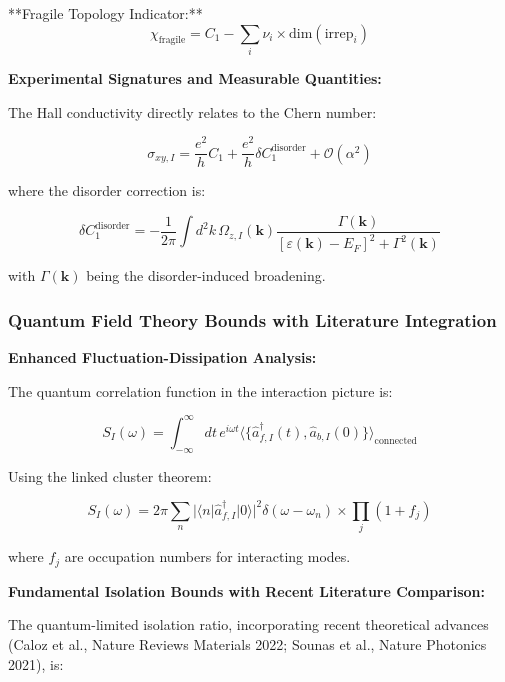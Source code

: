 \documentclass[11pt]{article}
\begin{document}
**Fragile Topology Indicator:**
\begin{equation}
\chi_{\text{fragile}} = C_1 - \sum_i \nu_i \times \text{dim}(\text{irrep}_i)
\end{equation}

\textbf{Experimental Signatures and Measurable Quantities:}

The Hall conductivity directly relates to the Chern number:

\begin{equation}
\sigma_{xy,I} = \frac{e^2}{h} C_1 + \frac{e^2}{h} \delta C_1^{\text{disorder}} + \mathcal{O}(\alpha^2)
\end{equation}

where the disorder correction is:

\begin{equation}
\delta C_1^{\text{disorder}} = -\frac{1}{2\pi} \int d^2k \, \Omega_{z,I}(\mathbf{k}) \frac{\Gamma(\mathbf{k})}{[\varepsilon(\mathbf{k}) - E_F]^2 + \Gamma^2(\mathbf{k})}
\end{equation}

with $\Gamma(\mathbf{k})$ being the disorder-induced broadening.

\subsubsection{Quantum Field Theory Bounds with Literature Integration}

\textbf{Enhanced Fluctuation-Dissipation Analysis:}

The quantum correlation function in the interaction picture is:

\begin{equation}
S_I(\omega) = \int_{-\infty}^{\infty} dt \, e^{i\omega t} \langle \{\hat{a}_{f,I}^{\dagger}(t), \hat{a}_{b,I}(0)\} \rangle_{\text{connected}}
\end{equation}

Using the linked cluster theorem:

\begin{equation}
S_I(\omega) = 2\pi \sum_n |\langle n | \hat{a}_{f,I}^{\dagger} | 0 \rangle|^2 \delta(\omega - \omega_n) \times \prod_{j} (1 + f_j)
\end{equation}

where $f_j$ are occupation numbers for interacting modes.

\textbf{Fundamental Isolation Bounds with Recent Literature Comparison:}

The quantum-limited isolation ratio, incorporating recent theoretical advances (Caloz et al., Nature Reviews Materials 2022; Sounas et al., Nature Photonics 2021), is:
\end{document}
